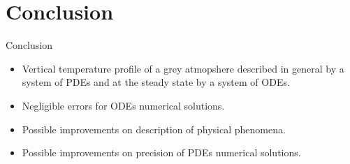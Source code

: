 \documentclass[aspectratio=43]{beamer}
\begin{document}
\section{Conclusion}
\begin{frame}{Conclusion}
  \begin{itemize}
    \item Vertical temperature profile of a grey atmopshere described in general by a system of PDEs and at the steady state by a system of ODEs.
    \item Negligible errors for ODEs numerical solutions.
    \item Possible improvements on description of physical phenomena.
    \item Possible improvements on precision of PDEs numerical solutions.
  \end{itemize}
\end{frame}
\end{document}
